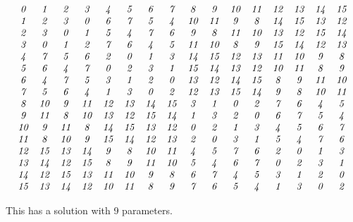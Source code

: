 \documentclass[12pt]{article}
\begin{document}
\begin{displaymath}
\begin{array}{cccccccccccccccc}
\G0&\G1&\G2&\G3&\G4&\G5&\G6&\G7&\G8&\G9&\G1\G0&\G1\G1&\G1\G2&\G1\G3&\G1\G4&\G1\G5\\
\G1&\G2&\G3&\G0&\G6&\G7&\G5&\G4&\G1\G0&\G1\G1&\G9&\G8&\G1\G4&\G1\G5&\G1\G3&\G1\G2\\
\G2&\G3&\G0&\G1&\G5&\G4&\G7&\G6&\G9&\G8&\G1\G1&\G1\G0&\G1\G3&\G1\G2&\G1\G5&\G1\G4\\
\G3&\G0&\G1&\G2&\G7&\G6&\G4&\G5&\G1\G1&\G1\G0&\G8&\G9&\G1\G5&\G1\G4&\G1\G2&\G1\G3\\
\G4&\G7&\G5&\G6&\G2&\G0&\G1&\G3&\G1\G4&\G1\G5&\G1\G2&\G1\G3&\G1\G1&\G1\G0&\G9&\G8\\
\G5&\G6&\G4&\G7&\G0&\G2&\G3&\G1&\G1\G5&\G1\G4&\G1\G3&\G1\G2&\G1\G0&\G1\G1&\G8&\G9\\
\G6&\G4&\G7&\G5&\G3&\G1&\G2&\G0&\G1\G3&\G1\G2&\G1\G4&\G1\G5&\G8&\G9&\G1\G1&\G1\G0\\
\G7&\G5&\G6&\G4&\G1&\G3&\G0&\G2&\G1\G2&\G1\G3&\G1\G5&\G1\G4&\G9&\G8&\G1\G0&\G1\G1\\
\G8&\G1\G0&\G9&\G1\G1&\G1\G2&\G1\G3&\G1\G4&\G1\G5&\G3&\G1&\G0&\G2&\G7&\G6&\G4&\G5\\
\G9&\G1\G1&\G8&\G1\G0&\G1\G3&\G1\G2&\G1\G5&\G1\G4&\G1&\G3&\G2&\G0&\G6&\G7&\G5&\G4\\
\G1\G0&\G9&\G1\G1&\G8&\G1\G4&\G1\G5&\G1\G3&\G1\G2&\G0&\G2&\G1&\G3&\G4&\G5&\G6&\G7\\
\G1\G1&\G8&\G1\G0&\G9&\G1\G5&\G1\G4&\G1\G2&\G1\G3&\G2&\G0&\G3&\G1&\G5&\G4&\G7&\G6\\
\G1\G2&\G1\G5&\G1\G3&\G1\G4&\G9&\G8&\G1\G0&\G1\G1&\G4&\G5&\G7&\G6&\G2&\G0&\G1&\G3\\
\G1\G3&\G1\G4&\G1\G2&\G1\G5&\G8&\G9&\G1\G1&\G1\G0&\G5&\G4&\G6&\G7&\G0&\G2&\G3&\G1\\
\G1\G4&\G1\G2&\G1\G5&\G1\G3&\G1\G1&\G1\G0&\G9&\G8&\G6&\G7&\G4&\G5&\G3&\G1&\G2&\G0\\
\G1\G5&\G1\G3&\G1\G4&\G1\G2&\G1\G0&\G1\G1&\G8&\G9&\G7&\G6&\G5&\G4&\G1&\G3&\G0&\G2
\end{array}
\end{displaymath}
 
This has a solution with 9 parameters.
\end{document}
